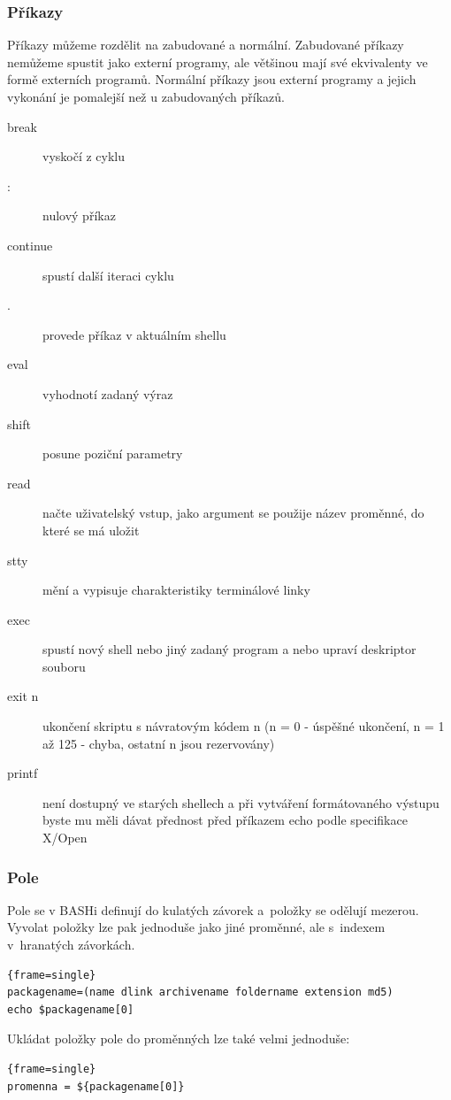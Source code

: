 \documentclass[a4paper,12pt]{article}
\newenvironment{codeframe}{%
  \begin{Sbox} 
    \begin{minipage} 
      {\columnwidth-\leftmargin-\rightmargin-2\fboxsep-2\fboxrule-4pt} 
}{%

  \end{minipage} 
  \end{Sbox} 
  \begin{center} 
    \fcolorbox{black}{codeback}{\TheSbox} 
  \end{center} 
}
\begin{document}
\subsubsection{Příkazy}
Příkazy můžeme rozdělit na zabudované a normální. Zabudované příkazy nemůžeme spustit jako externí programy, ale většinou mají své ekvivalenty ve formě externích programů. Normální příkazy jsou externí programy a jejich vykonání je pomalejší než u zabudovaných příkazů\cite{ABC_SBASH}.
\begin{description}
 \item[break] vyskočí z cyklu
 \item[:] nulový příkaz
 \item[continue] spustí další iteraci cyklu
 \item[.] provede příkaz v aktuálním shellu
 \item[eval] vyhodnotí zadaný výraz
 \item[shift] posune poziční parametry
 \item[read] načte uživatelský vstup, jako argument se použije název proměnné, do které se má uložit
 \item[stty] mění a vypisuje charakteristiky terminálové linky
 \item[exec] spustí nový shell nebo jiný zadaný program a nebo upraví deskriptor souboru
 \item[exit n] ukončení skriptu s návratovým kódem n (n = 0 - úspěšné ukončení, n = 1 až 125 - chyba, ostatní n jsou rezervovány)
 \item[printf] není dostupný ve starých shellech a při vytváření formátovaného výstupu byste mu měli dávat přednost před příkazem echo podle specifikace X/Open
 \end{description}

\subsubsection{Pole}
Pole se v BASHi definují do kulatých závorek a~položky se odělují mezerou. Vyvolat položky lze pak jednoduše jako jiné proměnné, ale s~indexem v~hranatých závorkách.~\cite{BASHen}
    \begin{codeframe}
      \begin{Verbatim}{frame=single}
packagename=(name dlink archivename foldername extension md5)
echo $packagename[0]
\end{Verbatim} 
    \end{codeframe}
Ukládat položky pole do proměnných lze také velmi jednoduše:
    \begin{codeframe}
      \begin{Verbatim}{frame=single}
promenna = ${packagename[0]}
\end{Verbatim} 
    \end{codeframe}
\end{document}
